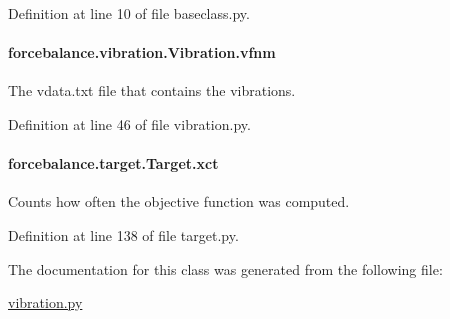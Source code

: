 Definition at line 10 of file baseclass.\-py.

\hypertarget{classforcebalance_1_1vibration_1_1Vibration_a50552dbdadc7a86aaab97bfdcf85e449}{
\paragraph[{vfnm}]{\setlength{\rightskip}{0pt plus 5cm}forcebalance.\-vibration.\-Vibration.\-vfnm}}\label{classforcebalance_1_1vibration_1_1Vibration_a50552dbdadc7a86aaab97bfdcf85e449}


The vdata.\-txt file that contains the vibrations. 



Definition at line 46 of file vibration.\-py.

\hypertarget{classforcebalance_1_1target_1_1Target_aad2e385cfbf7b4a68f1c2cb41133fe82}{
\paragraph[{xct}]{\setlength{\rightskip}{0pt plus 5cm}forcebalance.\-target.\-Target.\-xct\hspace{0.3cm}{\ttfamily [inherited]}}}\label{classforcebalance_1_1target_1_1Target_aad2e385cfbf7b4a68f1c2cb41133fe82}


Counts how often the objective function was computed. 



Definition at line 138 of file target.\-py.



The documentation for this class was generated from the following file\-:\begin{DoxyCompactItemize}
\item 
\hyperlink{vibration_8py}{vibration.\-py}\end{DoxyCompactItemize}
